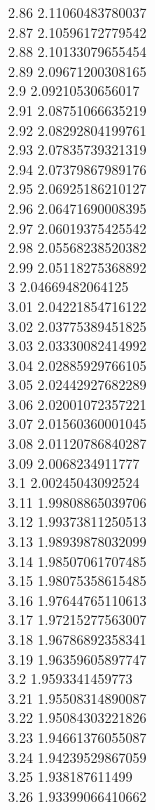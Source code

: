 {2.86	2.11060483780037\\
2.87	2.10596172779542\\
2.88	2.10133079655454\\
2.89	2.09671200308165\\
2.9	2.09210530656017\\
2.91	2.08751066635219\\
2.92	2.08292804199761\\
2.93	2.07835739321319\\
2.94	2.07379867989176\\
2.95	2.06925186210127\\
2.96	2.06471690008395\\
2.97	2.06019375425542\\
2.98	2.05568238520382\\
2.99	2.05118275368892\\
3	2.04669482064125\\
3.01	2.04221854716122\\
3.02	2.03775389451825\\
3.03	2.03330082414992\\
3.04	2.02885929766105\\
3.05	2.02442927682289\\
3.06	2.02001072357221\\
3.07	2.01560360001045\\
3.08	2.01120786840287\\
3.09	2.0068234911777\\
3.1	2.00245043092524\\
3.11	1.99808865039706\\
3.12	1.99373811250513\\
3.13	1.98939878032099\\
3.14	1.98507061707485\\
3.15	1.98075358615485\\
3.16	1.97644765110613\\
3.17	1.97215277563007\\
3.18	1.96786892358341\\
3.19	1.96359605897747\\
3.2	1.9593341459773\\
3.21	1.95508314890087\\
3.22	1.95084303221826\\
3.23	1.94661376055087\\
3.24	1.94239529867059\\
3.25	1.938187611499\\
3.26	1.93399066410662\\
}
